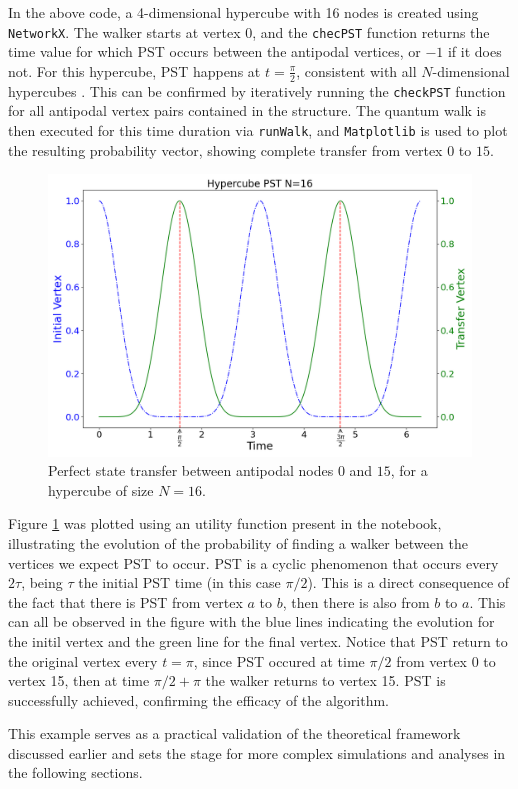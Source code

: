 \documentclass[../../main.tex]{subfiles}
\begin{document}
In the above code, a 4-dimensional hypercube with 16 nodes is created using
\texttt{NetworkX}. The walker starts at vertex 0, and the \texttt{checPST}
function returns the time value for which PST occurs between the antipodal
vertices, or $-1$ if it does not. For this hypercube, PST happens at $t =
\frac{\pi}{2}$, consistent with all $N$-dimensional hypercubes
\cite{christandlPerfect04,Christandl2005}. This can be confirmed by iteratively
running the \texttt{checkPST} function for all antipodal vertex pairs contained
in the structure. The quantum walk is then executed for this time duration via
\texttt{runWalk}, and \texttt{Matplotlib} is used to plot the resulting
probability vector, showing complete transfer from vertex $0$ to $15$.\par

\begin{figure}[!h]
    \centering
    \includegraphics[scale=\mysinglefigurescale]{img/QWAK/PerfectStateTransfer/Hypercube_N16_T6.28_FROM0_TO15.png}
    \caption{Perfect state transfer between antipodal nodes $0$ and $15$, for a hypercube of size $N=16$.}
    \label{fig:hypercube_pst}
\end{figure}

Figure \ref{fig:hypercube_pst} was plotted using an utility function present in
the notebook, illustrating the evolution of the probability of finding a walker
between the vertices we expect PST to occur. PST is a cyclic phenomenon that
occurs every $2\tau$, being $\tau$ the initial PST time (in this case $\pi/2$).
This is a direct consequence of the fact that there is PST from vertex $a$ to
$b$, then there is also from $b$ to $a$. This can all be observed in the figure
with the blue lines indicating the evolution for the initil vertex and the
green line for the final vertex. Notice that PST return to the original vertex
every $t=\pi$, since PST occured at time $\pi/2$ from vertex 0 to vertex 15,
then at time $\pi/2 + \pi$ the walker returns to vertex 15. PST is successfully
achieved, confirming the efficacy of the algorithm.

This example serves as a practical validation of the theoretical framework
discussed earlier and sets the stage for more complex simulations and analyses
in the following sections.
\end{document}
